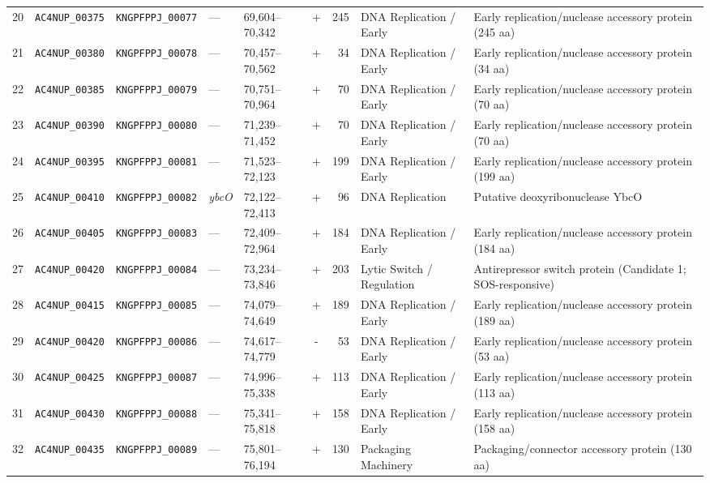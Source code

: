 \begin{landscape}
\begin{xltabular}{\linewidth}{cp{2.4cm}p{2.4cm}p{1.4cm}p{2.6cm}crp{3.2cm}X}
20 & \texttt{AC4NUP\_00375} & \texttt{KNGPFPPJ\_00077} & --- & 69,604--70,342 & + & 245 & DNA Replication / Early & Early replication/nuclease accessory protein (245 aa) \\
21 & \texttt{AC4NUP\_00380} & \texttt{KNGPFPPJ\_00078} & --- & 70,457--70,562 & + & 34 & DNA Replication / Early & Early replication/nuclease accessory protein (34 aa) \\
22 & \texttt{AC4NUP\_00385} & \texttt{KNGPFPPJ\_00079} & --- & 70,751--70,964 & + & 70 & DNA Replication / Early & Early replication/nuclease accessory protein (70 aa) \\
23 & \texttt{AC4NUP\_00390} & \texttt{KNGPFPPJ\_00080} & --- & 71,239--71,452 & + & 70 & DNA Replication / Early & Early replication/nuclease accessory protein (70 aa) \\
24 & \texttt{AC4NUP\_00395} & \texttt{KNGPFPPJ\_00081} & --- & 71,523--72,123 & + & 199 & DNA Replication / Early & Early replication/nuclease accessory protein (199 aa) \\
25 & \texttt{AC4NUP\_00410} & \texttt{KNGPFPPJ\_00082} & \textit{ybcO} & 72,122--72,413 & + & 96 & DNA Replication & Putative deoxyribonuclease YbcO \\
26 & \texttt{AC4NUP\_00405} & \texttt{KNGPFPPJ\_00083} & --- & 72,409--72,964 & + & 184 & DNA Replication / Early & Early replication/nuclease accessory protein (184 aa) \\
27 & \texttt{AC4NUP\_00420} & \texttt{KNGPFPPJ\_00084} & --- & 73,234--73,846 & + & 203 & Lytic Switch / Regulation & Antirepressor switch protein (Candidate 1; SOS-responsive) \\
28 & \texttt{AC4NUP\_00415} & \texttt{KNGPFPPJ\_00085} & --- & 74,079--74,649 & + & 189 & DNA Replication / Early & Early replication/nuclease accessory protein (189 aa) \\
29 & \texttt{AC4NUP\_00420} & \texttt{KNGPFPPJ\_00086} & --- & 74,617--74,779 & - & 53 & DNA Replication / Early & Early replication/nuclease accessory protein (53 aa) \\
30 & \texttt{AC4NUP\_00425} & \texttt{KNGPFPPJ\_00087} & --- & 74,996--75,338 & + & 113 & DNA Replication / Early & Early replication/nuclease accessory protein (113 aa) \\
31 & \texttt{AC4NUP\_00430} & \texttt{KNGPFPPJ\_00088} & --- & 75,341--75,818 & + & 158 & DNA Replication / Early & Early replication/nuclease accessory protein (158 aa) \\
32 & \texttt{AC4NUP\_00435} & \texttt{KNGPFPPJ\_00089} & --- & 75,801--76,194 & + & 130 & Packaging Machinery & Packaging/connector accessory protein (130 aa) \\

\end{xltabular}
\end{landscape}
